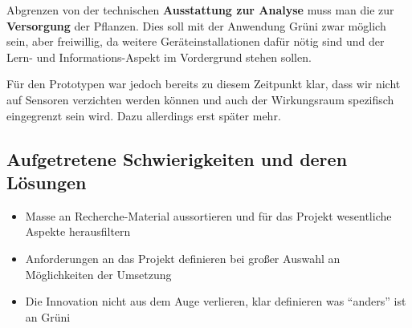 Abgrenzen von der technischen \textbf{Ausstattung zur Analyse} muss man
die zur \textbf{Versorgung} der Pflanzen. Dies soll mit der Anwendung
Grüni zwar möglich sein, aber freiwillig, da weitere
Geräteinstallationen dafür nötig sind und der Lern- und
Informations-Aspekt im Vordergrund stehen sollen.

Für den Prototypen war jedoch bereits zu diesem Zeitpunkt klar, dass wir
nicht auf Sensoren verzichten werden können und auch der Wirkungsraum
spezifisch eingegrenzt sein wird. Dazu allerdings erst später mehr.

\hypertarget{aufgetretene-schwierigkeiten-und-deren-luxf6sungen}{%
\subsection{Aufgetretene Schwierigkeiten und deren
Lösungen}\label{aufgetretene-schwierigkeiten-und-deren-luxf6sungen}}

\begin{itemize}
\tightlist
\item
  Masse an Recherche-Material aussortieren und für das Projekt
  wesentliche Aspekte herausfiltern
\item
  Anforderungen an das Projekt definieren bei großer Auswahl an
  Möglichkeiten der Umsetzung
\item
  Die Innovation nicht aus dem Auge verlieren, klar definieren was
  ``anders'' ist an Grüni
\end{itemize}
